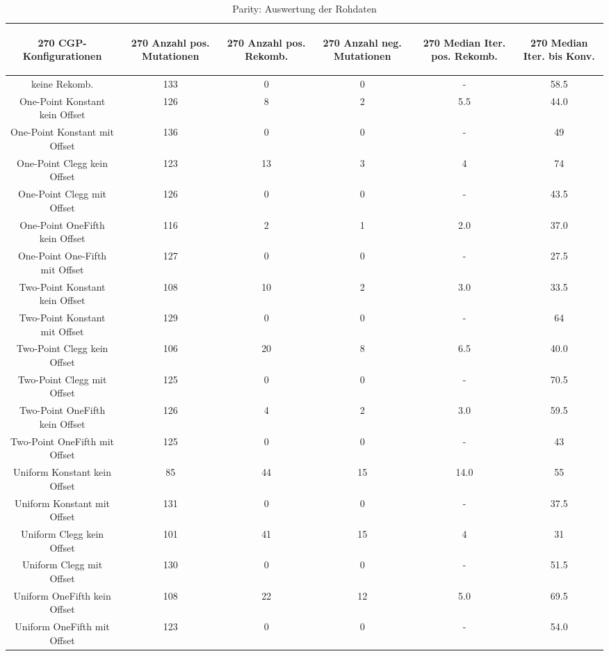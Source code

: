 \begin{table}[H]
	\centering
	\begin{tabular}{c | c | c | c | c | c }
		\begin{turn}{270} \textbf{CGP-Konfigurationen} \end{turn} & \begin{turn}{270} \textbf{Anzahl pos. Mutationen} \end{turn} & \begin{turn}{270} \textbf{Anzahl pos. Rekomb.} \end{turn} & \begin{turn}{270} \textbf{Anzahl neg. Mutationen} \end{turn} & \begin{turn}{270} \textbf{Median Iter. pos. Rekomb.} \end{turn} & \begin{turn}{270} \textbf{Median Iter. bis Konv.} \end{turn}\\
		\hline
		keine Rekomb. & 133 & 0 & 0 & - & 58.5\\
		\hline
		One-Point Konstant kein Offset & 126 & 8 & 2 & 5.5 & 44.0\\
		\hline
		One-Point Konstant mit Offset & 136 & 0 & 0 & - & 49\\
		\hline
		One-Point Clegg kein Offset & 123 & 13 & 3 & 4 & 74\\
		\hline
		One-Point Clegg mit Offset & 126 & 0 & 0 & - & 43.5\\
		\hline
		One-Point OneFifth kein Offset & 116 & 2 & 1 & 2.0 & 37.0\\
		\hline
		One-Point One-Fifth mit Offset & 127 & 0 & 0 & - & 27.5\\
		\hline
		Two-Point Konstant kein Offset & 108 & 10 & 2 & 3.0 & 33.5\\
		\hline
		Two-Point Konstant mit Offset & 129 & 0 & 0 & - & 64\\
		\hline
		Two-Point Clegg kein Offset & 106 & 20 & 8 & 6.5 & 40.0\\
		\hline
		Two-Point Clegg mit Offset & 125 & 0 & 0 & - & 70.5\\
		\hline
		Two-Point OneFifth kein Offset & 126 & 4 & 2 & 3.0 & 59.5\\
		\hline
		Two-Point OneFifth mit Offset & 125 & 0 & 0 & - & 43\\
		\hline
		Uniform Konstant kein Offset & 85 & 44 & 15 & 14.0 & 55\\
		\hline
		Uniform Konstant mit Offset & 131 & 0 & 0 & - & 37.5\\
		\hline
		Uniform Clegg kein Offset & 101 & 41 & 15 & 4 & 31\\
		\hline
		Uniform Clegg mit Offset & 130 & 0 & 0 & - & 51.5\\
		\hline
		Uniform OneFifth kein Offset & 108 & 22 & 12 & 5.0 & 69.5\\
		\hline
		Uniform OneFifth mit Offset & 123 & 0 & 0 & - & 54.0\\
	\end{tabular}
	\caption{Parity: Auswertung der Rohdaten}
	\label{table:parityRohdaten}
\end{table}

